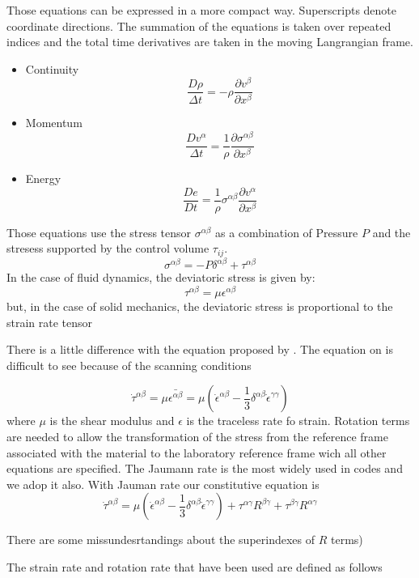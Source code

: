 \documentclass[10pt, twocolumn]{thesis}
\begin{document}
Those equations can be expressed in a more compact way. Superscripts denote coordinate directions. The summation of the equations is taken over repeated indices and the total time derivatives are taken in the moving Langrangian frame.
\begin{itemize}
\item Continuity
\[\frac{D\rho}{\Delta t} = -\rho\frac{\partial v^\beta}{\partial x^\beta}\]
\item Momentum
\[\frac{Dv^\alpha}{\Delta t} = \frac{1}{\rho}\frac{\partial\sigma^{\alpha\beta}}{\partial x^{\beta}}\]
\item Energy
\[\frac{De}{Dt}=\frac{1}{\rho}\sigma^{\alpha\beta}\frac{\partial v^\alpha}{\partial x^\beta}\]
\end{itemize}
Those equations use the stress tensor $\sigma^{\alpha\beta}$ as a combination of Pressure $P$ and the stresess supported by the control volume $\tau_{ij}$.
\[\sigma^{\alpha\beta} = -P\delta^{\alpha\beta} + \tau^{\alpha\beta}\]
In the case of fluid dynamics, the deviatoric stress is given by:
\[\tau^{\alpha\beta}=\mu\epsilon^{\alpha\beta}\]
but, in the case of solid mechanics, the deviatoric stress is proportional to the strain rate tensor\cite{Luna_SPH}\cite{allahdadi93} 
\begin{scriptsize}
There is a little difference with the equation proposed by \cite{benz95}. The equation on \cite{allahdadi93} is difficult to see because of the scanning conditions
\end{scriptsize}
\[\dot{\tau}^{\alpha\beta}=\mu\bar{\epsilon^{\alpha\beta}} = \mu\left(\dot{\epsilon}^{\alpha\beta}-\frac{1}{3}\delta^{\alpha\beta}\dot{\epsilon}^{\gamma\gamma}\right)\]
where $\mu$ is the shear modulus and $\epsilon$ is the traceless rate fo strain.
Rotation terms are needed to allow the transformation of the stress from the reference frame associated with the material to the laboratory reference frame wich all other equations are specified\cite{allahdadi93}\cite{benz95}. The Jaumann rate is the most widely used in codes and we adop it also. With Jauman rate our constitutive equation is
\[\dot{\tau}^{\alpha\beta} = \mu\left(\dot{\epsilon}^{\alpha\beta}-\frac{1}{3}\delta^{\alpha\beta}\dot{\epsilon}^{\gamma\gamma}\right) + \tau^{\alpha\gamma}R^{\beta\gamma} + \tau^{\beta\gamma}R^{\alpha\gamma}\]
\begin{scriptsize}
There are some missundesrtandings about the superindexes of $R$ terms)
\end{scriptsize}
The strain rate and rotation rate that have been used are defined as follows\cite{allahdadi93}\cite{benz95}
\end{document}
